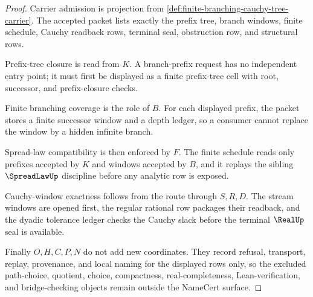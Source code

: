 \begin{proof}
Carrier admission is projection from \autoref{def:finite-branching-cauchy-tree-carrier}. The accepted packet lists exactly the prefix tree, branch windows, finite schedule, Cauchy readback rows, terminal seal, obstruction row, and structural rows.

Prefix-tree closure is read from $K$. A branch-prefix request has no independent entry point; it must first be displayed as a finite prefix-tree cell with root, successor, and prefix-closure checks.

Finite branching coverage is the role of $B$. For each displayed prefix, the packet stores a finite successor window and a depth ledger, so a consumer cannot replace the window by a hidden infinite branch.

Spread-law compatibility is then enforced by $F$. The finite schedule reads only prefixes accepted by $K$ and windows accepted by $B$, and it replays the sibling $\SpreadLawUp$ discipline before any analytic row is exposed.

Cauchy-window exactness follows from the route through $S,R,D$. The stream windows are opened first, the regular rational row packages their readback, and the dyadic tolerance ledger checks the Cauchy slack before the terminal $\RealUp$ seal is available.

Finally $O,H,C,P,N$ do not add new coordinates. They record refusal, transport, replay, provenance, and local naming for the displayed rows only, so the excluded path-choice, quotient, choice, compactness, real-completeness, Lean-verification, and bridge-checking objects remain outside the NameCert surface.
\end{proof}

